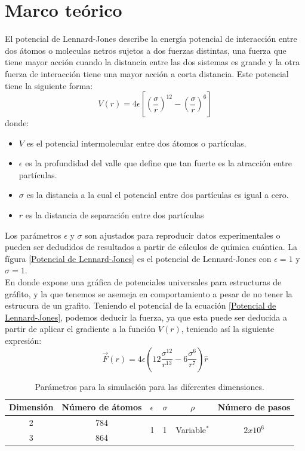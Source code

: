 \documentclass[reprint,amsmath,amssymb,aps,]{revtex4-2}
\begin{document}
\section{Marco teórico}
El potencial de Lennard-Jones describe la energía potencial de interacción entre dos átomos o moleculas netros sujetos a dos fuerzas distintas, una fuerza que tiene mayor acción cuando la distancia entre las dos sistemas es grande y la otra fuerza de interacción tiene una mayor acción a corta distancia. Este potencial tiene la siguiente forma:
\begin{equation}
    \label{Potencial de Lennard-Jones}
    V(r) = 4 \epsilon \left[\left(\frac{\sigma}{r} \right)^{12} - \left(\frac{\sigma}{r} \right)^6 \right]
\end{equation}
donde:
\begin{itemize}
    \item $V$ es el potencial intermolecular entre dos átomos o partículas.
    \item $\epsilon$ es la profundidad del valle que define que tan fuerte es la atracción entre partículas.
    \item $\sigma$ es la distancia a la cual el potencial entre dos partículas es igual a cero.
    \item $r$ es la distancia de separación entre dos partículas
\end{itemize}
Los parámetros $\epsilon$ y $\sigma$ son ajustados para reproducir datos experimentales o pueden ser dedudidos de resultados a partir de cálculos de química cuántica. La fígura \ref{Potencial de Lennard-Jones} es el potencial de Lennard-Jones con $\epsilon=1$ y $\sigma=1$.\\
En donde \cite{Girifalco2000} expone una gráfica de potenciales universales para estructuras de gráfito, y la que tenemos se asemeja en comportamiento a pesar de no tener la estrucura de un grafito.
Teniendo el potencial de la ecuación \ref{Potencial de Lennard-Jones}, podemos deducir la fuerza, ya que esta puede ser deducida a partir de aplicar el gradiente a la función $V(r)$, teniendo así la siguiente expresión:
\begin{equation}
    \label{eq:fuerzateo}
    \vec{F}(r)= 4\epsilon \left(12\frac{\sigma^{12}}{r^{13}}- 6 \frac{\sigma^6}{r^7} \right) \hat{r}
\end{equation}\begin{table}
    \centering
    \begin{tabular}{ccp{1cm}p{0.5cm}cc}
        \hline
        Dimensión & Número de átomos & $\epsilon$ & $\sigma $ & $\rho $ & Número de pasos \\ \hline
        2 &784 &\multirow{2}{*}{1} &\multirow{2}{*}{1}  &\multirow{2}{*}{Variable$^{*}$}  &\multirow{2}{*}{$2x10^{6}$}  \\
        3 &864 & & & & \\ \hline
    \end{tabular}
    \caption{Parámetros para la simulación para las diferentes dimensiones.}
    \label{table:parametros}
\end{table}
\end{document}
